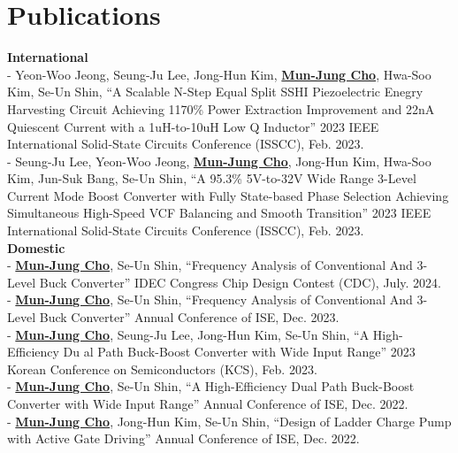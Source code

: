 \documentclass[a4paper,11pt]{article}
\begin{document}
\section{\textbf{Publications}}
 \begin{itemize}[leftmargin=0.05in, label={}]
    \small{\item{
     \textbf{International} \\
        - Yeon-Woo Jeong, Seung-Ju Lee, Jong-Hun Kim, \textbf{\underline{Mun-Jung Cho}}, Hwa-Soo Kim, Se-Un Shin, “A Scalable N-Step Equal Split SSHI Piezoelectric Enegry Harvesting Circuit Achieving 1170\% Power Extraction Improvement and 22nA Quiescent Current with a 1uH-to-10uH Low Q Inductor” 2023 IEEE International Solid-State Circuits Conference (ISSCC), Feb. 2023. \\
        \vspace{2mm}
        - Seung-Ju Lee, Yeon-Woo Jeong, \textbf{\underline{Mun-Jung Cho}}, Jong-Hun Kim, Hwa-Soo Kim, Jun-Suk Bang, Se-Un Shin, “A 95.3\% 5V-to-32V Wide Range 3-Level Current Mode Boost Converter with Fully State-based Phase Selection Achieving Simultaneous High-Speed VCF Balancing and Smooth Transition” 2023 IEEE International Solid-State Circuits Conference (ISSCC), Feb. 2023. \\
        \vspace{2mm}
     \textbf{Domestic} \\
        - \textbf{\underline{Mun-Jung Cho}}, Se-Un Shin, “Frequency Analysis of Conventional And 3-Level Buck Converter” IDEC Congress Chip Design Contest (CDC), July. 2024. \\
        \vspace{2mm}
        - \textbf{\underline{Mun-Jung Cho}}, Se-Un Shin, “Frequency Analysis of Conventional And 3-Level Buck Converter” Annual Conference of ISE, Dec. 2023. \\
        \vspace{2mm}
        - \textbf{\underline{Mun-Jung Cho}}, Seung-Ju Lee, Jong-Hun Kim, Se-Un Shin, “A High-Efficiency Du al Path Buck-Boost Converter with Wide Input Range” 2023 Korean Conference on Semiconductors (KCS), Feb. 2023. \\
        \vspace{2mm}
        - \textbf{\underline{Mun-Jung Cho}}, Se-Un Shin, “A High-Efficiency Dual Path Buck-Boost Converter with Wide Input Range” Annual Conference of ISE, Dec. 2022. \\
        \vspace{2mm}
        - \textbf{\underline{Mun-Jung Cho}}, Jong-Hun Kim, Se-Un Shin, “Design of Ladder Charge Pump with Active Gate Driving” Annual Conference of ISE, Dec. 2022. \\

    }}
 \end{itemize}
 \vspace{-16pt}
\end{document}
